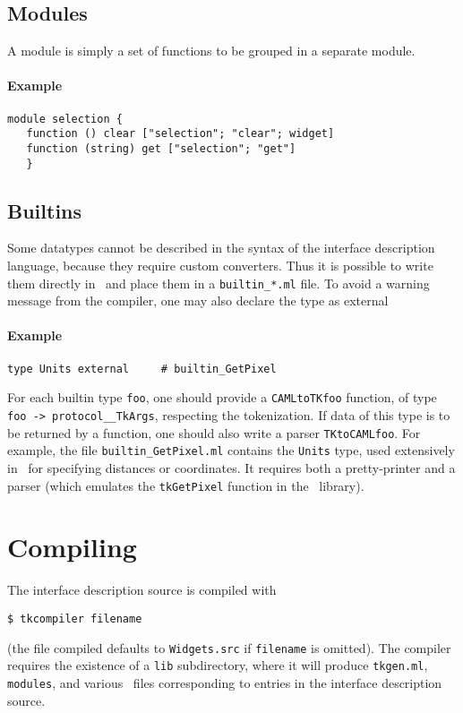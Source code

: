 \subsection{Modules}
A module is simply a set of functions to be grouped in a separate module.
\paragraph{Example}
\begin{verbatim}
module selection {
   function () clear ["selection"; "clear"; widget]
   function (string) get ["selection"; "get"]
   }
\end{verbatim} 

\subsection{Builtins}
Some datatypes cannot be described in the syntax of the interface
description language, because they require custom converters. Thus it is
possible to write them directly in \caml\ and place 
them in a \verb|builtin_*.ml| file.
To avoid a warning message from the compiler, one may also declare the type
as external
\paragraph{Example}
\begin{verbatim}
type Units external     # builtin_GetPixel
\end{verbatim} 
For each builtin type \verb|foo|, one should provide a \verb|CAMLtoTKfoo|
function, of type \verb|foo -> protocol__TkArgs|, respecting the
tokenization. If data of this type is to be returned by a function, one
should also write a parser \verb|TKtoCAMLfoo|.
For example, the file \verb|builtin_GetPixel.ml| contains the \verb|Units|
type, used extensively in \tk\ for specifying distances or coordinates.
It requires both a pretty-printer and a parser (which emulates the
\verb|tkGetPixel| function in the \tk\ library).


\section{Compiling}
The interface description source is compiled with
\begin{verbatim}
$ tkcompiler filename
\end{verbatim}
(the file compiled defaults to \verb|Widgets.src| if \verb|filename| is
omitted).
The compiler requires the existence of a \verb|lib| subdirectory, where it
will produce \verb|tkgen.ml|, \verb|modules|, and various \caml\ files
corresponding to entries in the interface description source.

